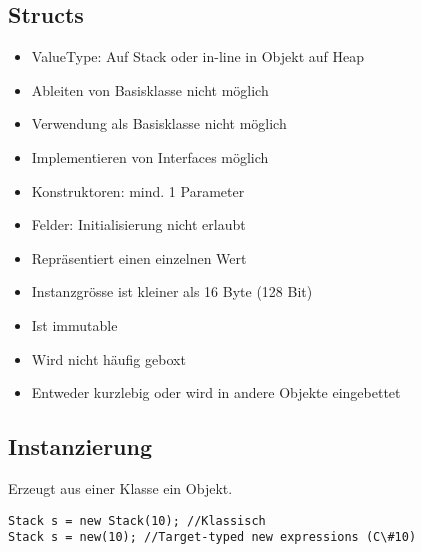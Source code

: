 \begin{multicols*}{2}
\subsection{Structs}
\begin{itemize}
    \item ValueType: Auf Stack oder in-line in Objekt auf Heap
    \item Ableiten von Basisklasse nicht möglich
    \item Verwendung als Basisklasse nicht möglich
    \item Implementieren von Interfaces möglich
    \item Konstruktoren: mind. 1 Parameter
    \item Felder: Initialisierung nicht erlaubt
\end{itemize}
\begin{itemize}
    \item Repräsentiert einen einzelnen Wert
    \item Instanzgrösse ist kleiner als 16 Byte (128 Bit)
    \item Ist \dq immutable\dq
    \item Wird nicht häufig geboxt
    \item Entweder kurzlebig oder wird in andere Objekte eingebettet
\end{itemize}

\subsection{Instanzierung}
Erzeugt aus einer Klasse ein Objekt.
\begin{lstlisting}
Stack s = new Stack(10); //Klassisch
Stack s = new(10); //Target-typed new expressions (C\#10)
\end{lstlisting}


\end{multicols*}
